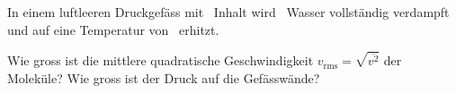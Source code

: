 In einem luftleeren Druckgefäss mit \VDO\ Inhalt wird \mWaO\ Wasser vollständig verdampft und auf eine Temperatur von \thDO\ erhitzt.
\begin{abcliste}
\abc Wie gross ist die mittlere quadratische Geschwindigkeit $v_\text{rms} = \sqrt{\overline{v^2}}$ der Moleküle?
\abc Wie gross ist der Druck auf die Gefässwände?
\end{abcliste}
